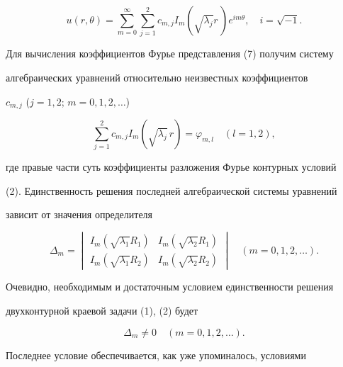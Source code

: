 \addtocounter{equation}{1}


\begin{equation} 


u(r,\theta)=\sum^\infty_{m=0}\sum^2_{j=1}c_{m,j}I_m 


(\sqrt{\lambda_j} r\,)e^{im\theta},\quad i=\sqrt{-1}. 


\end{equation} 


 


Для вычисления коэффициентов Фурье представления (7) получим систему 


алгебраических уравнений относительно неизвестных коэффициентов 


$c_{m,j}$ ($j=1,2$; $m=0,1,2,\dotsc$) 


$$ 


\sum^2_{j=1}c_{m,j}I_m(\sqrt{\lambda_j}\,r)=\varphi_{m,l}\quad 


(l=1,2), 


$$ 


где правые части суть коэффициенты разложения Фурье контурных условий 


(2). Единственность решения последней алгебраической системы уравнений 


зависит от значения определителя 


$$ 


\Delta_m= 


\begin{vmatrix} 


I_m(\sqrt{\lambda_1}R_1) & I_m(\sqrt{\lambda_2}R_1) \\ 


I_m(\sqrt{\lambda_1}R_2) & I_m(\sqrt{\lambda_2} R_2) 


\end{vmatrix} 


\quad (m=0,1,2,\dotsc). 


$$ 


 


Очевидно, необходимым и достаточным условием единственности решения 


двухконтурной краевой задачи (1), (2) будет 


\begin{equation} 


\Delta_m\ne 0\quad (m=0,1,2,\dotsc). 


\end{equation} 


Последнее условие обеспечивается, как уже упоминалось, условиями 


